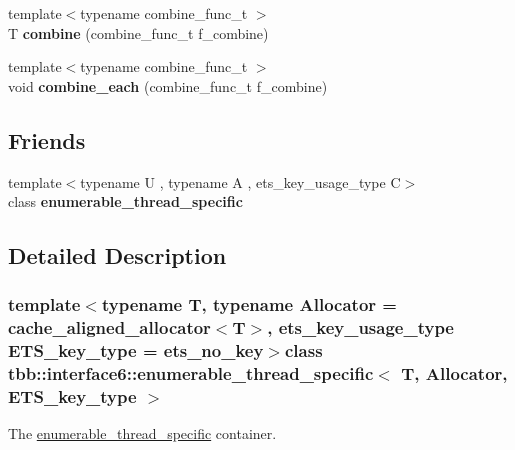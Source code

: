 \begin{DoxyCompactItemize}
\item 
\hypertarget{classtbb_1_1interface6_1_1enumerable__thread__specific_a7ab62b7fd2aeeb12e1a3b93c9ce99f27}{}{\footnotesize template$<$typename combine\+\_\+func\+\_\+t $>$ }\\T {\bfseries combine} (combine\+\_\+func\+\_\+t f\+\_\+combine)\label{classtbb_1_1interface6_1_1enumerable__thread__specific_a7ab62b7fd2aeeb12e1a3b93c9ce99f27}

\item 
\hypertarget{classtbb_1_1interface6_1_1enumerable__thread__specific_ae644ea36b776fdc698d87a60ef4a3179}{}{\footnotesize template$<$typename combine\+\_\+func\+\_\+t $>$ }\\void {\bfseries combine\+\_\+each} (combine\+\_\+func\+\_\+t f\+\_\+combine)\label{classtbb_1_1interface6_1_1enumerable__thread__specific_ae644ea36b776fdc698d87a60ef4a3179}

\end{DoxyCompactItemize}
\subsection*{Friends}
\begin{DoxyCompactItemize}
\item 
\hypertarget{classtbb_1_1interface6_1_1enumerable__thread__specific_a408a399f5d1ceaf6d0adc9451932a96a}{}{\footnotesize template$<$typename U , typename A , ets\+\_\+key\+\_\+usage\+\_\+type C$>$ }\\class {\bfseries enumerable\+\_\+thread\+\_\+specific}\label{classtbb_1_1interface6_1_1enumerable__thread__specific_a408a399f5d1ceaf6d0adc9451932a96a}

\end{DoxyCompactItemize}


\subsection{Detailed Description}
\subsubsection*{template$<$typename T, typename Allocator = cache\+\_\+aligned\+\_\+allocator$<$\+T$>$, ets\+\_\+key\+\_\+usage\+\_\+type E\+T\+S\+\_\+key\+\_\+type = ets\+\_\+no\+\_\+key$>$class tbb\+::interface6\+::enumerable\+\_\+thread\+\_\+specific$<$ T, Allocator, E\+T\+S\+\_\+key\+\_\+type $>$}

The \hyperlink{classtbb_1_1interface6_1_1enumerable__thread__specific}{enumerable\+\_\+thread\+\_\+specific} container. 

